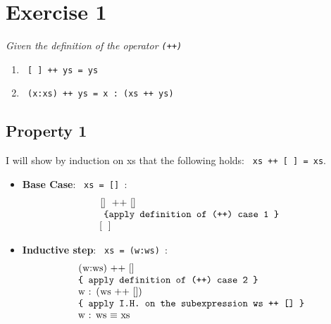 \documentclass[a4paper]{scrartcl}
\begin{document}
\section*{Exercise 1}
\emph{Given the definition of the operator \lstinline|(++)|}
\begin{enumerate}
	\item \lstinline | [ ] ++ ys = ys|
    \item \lstinline | (x:xs) ++ ys = x : (xs ++ ys) |
\end{enumerate}
\subsection*{Property 1}
I will show by induction on xs that the following holds: \lstinline| xs ++ [ ] = xs|.
\begin{itemize}
\item \textbf{Base Case}: \lstinline| xs = [] |:
	$$
    \begin{array}{l}
    	\text{\lstinline | [] ++ [] |} \\
    	 \texttt{ \{apply definition of (++) case 1 \} }\\
        \text{\lstinline | [ ] |} \\
    \end{array}
	$$
\item \textbf{Inductive step}: \lstinline| xs = (w:ws) |:
	$$
	\begin{array}{l}
	\text{\lstinline | (w:ws) ++ [] |} \\
    \texttt{\{ apply definition of (++) case 2 \}} \\
    \text{\lstinline | w : (ws ++ []) | } \\
    \texttt{\{ apply I.H. on the subexpression \lstinline | ws ++ [] | \}} \\
    \text{\lstinline | w : ws | $\equiv$ \lstinline | xs |} \\
    \end{array}
    $$
\end{itemize}
\end{document}
